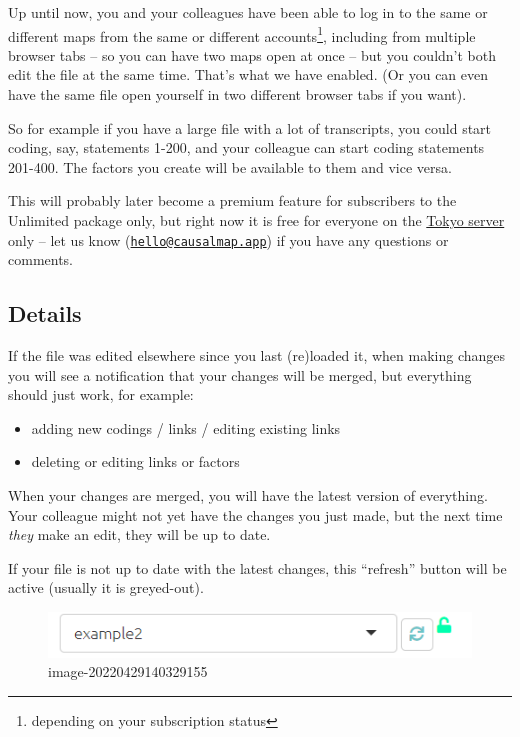 \documentclass[
]{book}
\providecommand{\tightlist}{%
  \setlength{\itemsep}{0pt}\setlength{\parskip}{0pt}}
\begin{document}
Up until now, you and your colleagues have been able to log in to the same or different maps from the same or different accounts\footnote{depending on your subscription status}, including from multiple browser tabs -- so you can have two maps open at once -- but you couldn't both edit the file at the same time. That's what we have enabled. (Or you can even have the same file open yourself in two different browser tabs if you want).

So for example if you have a large file with a lot of transcripts, you could start coding, say, statements 1-200, and your colleague can start coding statements 201-400. The factors you create will be available to them and vice versa.

This will probably later become a premium feature for subscribers to the Unlimited package only, but right now it is free for everyone on the \href{https://causalmap.shinyapps.io/tokyo/}{Tokyo server} only -- let us know (\href{mailto:hello@causalmap.app}{\nolinkurl{hello@causalmap.app}}) if you have any questions or comments.

\hypertarget{details}{%
\subsection{Details}\label{details}}

If the file was edited elsewhere since you last (re)loaded it, when making changes you will see a notification that your changes will be merged, but everything should just work, for example:

\begin{itemize}
\tightlist
\item
  adding new codings / links / editing existing links
\item
  deleting or editing links or factors
\end{itemize}

When your changes are merged, you will have the latest version of everything. Your colleague might not yet have the changes you just made, but the next time \emph{they} make an edit, they will be up to date.

If your file is not up to date with the latest changes, this ``refresh'' button will be active (usually it is greyed-out).

\begin{figure}
\centering
\includegraphics{_assets/image-20220429140329155.png}
\caption{image-20220429140329155}
\end{figure}
\end{document}
